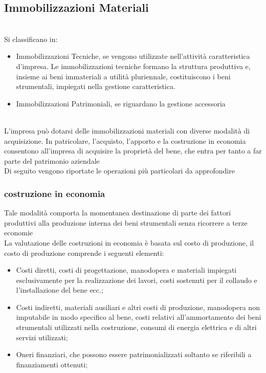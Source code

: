 \documentclass{report}
\begin{document}
\subsection{Immobilizzazioni Materiali} %
\label{sec:Immobilizzazioni Materiali}
\\
Si classificano in:
\\
\begin{itemize}
  \item{Immobilizzazioni Tecniche, se vengono utilizzate nell'attività caratteristica d'impresa. Le immobilizzazioni tecniche formano la struttura produttiva e, insieme ai beni immateriali a utilità pluriennale, costituiscono i beni strumentali, impiegati nella gestione caratteristica.}
  \item{Immobilizzazioni Patrimoniali, se riguardano la gestione accessoria}
\end{itemize}
\\
L'impresa può dotarsi delle immobilizzazioni materiali con diverse modalità di acquisizione. In patricolare, l'acquisto, l'apporto e la costruzione in economia consentono all'impresa di acquisire la proprietà del bene, che entra per tanto a far parte del patrimonio aziendale
\\
Di seguito vengono riportate le operazioni più particolari da approfondire
\\
\subsubsection{costruzione in economia} %
\label{sec:costruzione in economia}
Tale modalità comporta la momentanea destinazione di parte dei fattori produttivi alla produzione interna dei beni strumentali senza ricorrere a terze economie
\\
La valutazione delle costruzioni in economia è basata sul costo di produzione, il costo di produzione comprende i seguenti elementi:
\\
\begin{itemize}
  \item{Costi diretti, costi di progettazione, manodopera e materiali impiegati esclusivamente per la realizzazione dei lavori, costi sostenuti per il collaudo e l'installazione del bene ecc.;}
  \item{Costi indiretti, materiali ausiliari e altri costi di produzione, manodopera non imputabile in modo specifico al bene, costi relativi all'ammortamento dei beni strumentali utilizzati nella costruzione, consumi di energia elettrica e di altri servizi utilizzati;}
  \item{Oneri finanziari, che possono essere patrimonializzati soltanto se riferibili a finanziamenti ottenuti;}
\end{itemize}
\\
\end{document}
